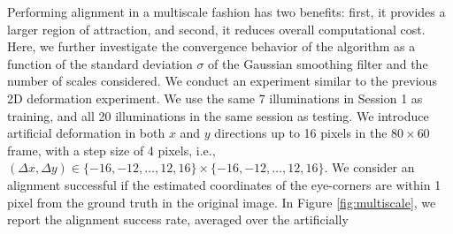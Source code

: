 \documentclass[12pt,journal,draftcls,letterpaper,onecolumn]{IEEEtran}
\begin{document}
Performing alignment in a multiscale fashion has two benefits: first, it provides a larger region of attraction, and second, it reduces overall computational cost. Here, we further investigate the convergence behavior of the algorithm as a function of the standard deviation $\sigma$ of the Gaussian smoothing filter and the number of scales considered.
We conduct an experiment similar to the previous 2D
deformation experiment. We use the same 7 illuminations in
Session 1 as training, and all 20 illuminations in the same
session as testing. We introduce artificial deformation in
both $x$ and $y$ directions up to 16 pixels in the
$80\times 60$ frame, with a step size of 4 pixels, i.e.,
$(\Delta x, \Delta y) \in \{-16,-12,\ldots,12,16\} \times
\{-16,-12,\ldots,12,16\}$. We consider an alignment
successful if the estimated coordinates of the eye-corners
are within 1 pixel from the ground truth in the original
image.  In Figure \ref{fig:multiscale}, we report the
alignment success rate, averaged over the artificially
\end{document}
